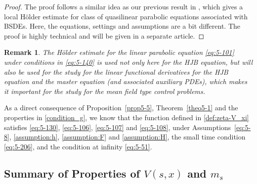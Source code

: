 \documentclass[11pt]{article}
\numberwithin{equation}{section}
\newtheorem{remark}{Remark}[section]
\newcommand{\1}{\mbox{1\hspace{-1mm}I}}
\begin{document}
\begin{proof}
The proof follows a similar idea as our previous result in \cite[Section 7]{4}, which gives a local H\"older estimate for class of quasilinear parabolic equations associated with BSDEs. Here, the equations, settings and assumptions are a bit different. The proof is highly technical and will be given in a separate article. 
\end{proof}

\begin{remark}
    The H\"older estimate for the linear parabolic equation \eqref{eq:5-101} under conditions in \eqref{eq:5-140} is used not only here for the HJB equation, but will also be used for the study for the linear functional derivatives for the HJB equation and the master equation (and associated auxiliary PDEs), which makes it important for the study for the mean field type control problems. 
\end{remark}

As a direct consequence of Proposition~\ref{prop5-5}, Theorem~\ref{theo5-1} and the properties in \eqref{condition_g}, we know that the function defined in \eqref{def:zeta-V_xi} satisfies \eqref{eq:5-130}, \eqref{eq:5-106}, \eqref{eq:5-107} and \eqref{eq:5-108}, under Assumptions~\ref{eq:5-8}, \ref{assumption:h}, \ref{assumption:F} and \ref{assumption:H}, the small time condition \eqref{eq:5-206}, and the condition at infinity \eqref{eq:5-51}. 

\subsection*{Summary of Properties of $V(s,x)$ and $m_s$}
\end{document}
